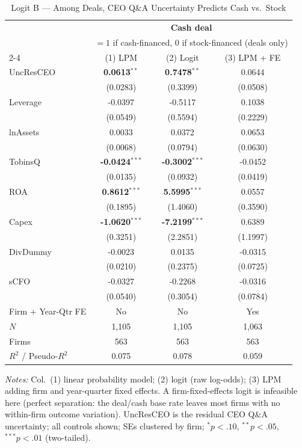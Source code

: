 \documentclass[11pt]{article}
\begin{document}
\clearpage
\begin{table}[htbp]\centering
\caption{Logit B --- Among Deals, CEO Q\&A Uncertainty Predicts Cash vs.\ Stock}
\label{tab:logit_cashstock}
\small\begin{tabular}{lccc}
\toprule
 & \multicolumn{3}{c}{\textbf{Cash deal}} \\
 & \multicolumn{3}{c}{\scriptsize $=1$ if cash-financed, $0$ if stock-financed (deals only)} \\
\cmidrule(lr){2-4}
 & (1) LPM & (2) Logit & (3) LPM + FE \\
\midrule
UncResCEO & \textbf{0.0613}$^{**}$ & \textbf{0.7478}$^{**}$ & 0.0644 \\
 & (0.0283) & (0.3399) & (0.0508) \\
\midrule
Leverage & -0.0397 & -0.5117 & 0.1038 \\
 & (0.0549) & (0.5594) & (0.2229) \\
lnAssets & 0.0033 & 0.0372 & 0.0653 \\
 & (0.0068) & (0.0794) & (0.0630) \\
TobinsQ & \textbf{-0.0424}$^{***}$ & \textbf{-0.3002}$^{***}$ & -0.0452 \\
 & (0.0135) & (0.0932) & (0.0419) \\
ROA & \textbf{0.8612}$^{***}$ & \textbf{5.5995}$^{***}$ & 0.0557 \\
 & (0.1895) & (1.4060) & (0.3590) \\
Capex & \textbf{-1.0620}$^{***}$ & \textbf{-7.2199}$^{***}$ & 0.6389 \\
 & (0.3251) & (2.2851) & (1.1997) \\
DivDummy & -0.0023 & 0.0135 & -0.0315 \\
 & (0.0210) & (0.2375) & (0.0725) \\
sCFO & -0.0327 & -0.2268 & -0.0316 \\
 & (0.0540) & (0.3054) & (0.0784) \\
\midrule
Firm + Year-Qtr FE & No & No & Yes \\
$N$ & 1,105 & 1,105 & 1,063 \\
Firms & 563 & 563 & 563 \\
$R^2$ / Pseudo-$R^2$ & 0.075 & 0.078 & 0.059 \\
\bottomrule\end{tabular}
\begin{minipage}{\linewidth}\vspace{2pt}\scriptsize\textit{Notes:} Col.\ (1) linear probability model; (2) logit (raw log-odds); (3) LPM adding firm and year-quarter fixed effects. A firm-fixed-effects logit is infeasible here (perfect separation: the deal/cash base rate leaves most firms with no within-firm outcome variation). UncResCEO is the residual CEO Q\&A uncertainty; all controls shown; SEs clustered by firm; $^{*}p<.10$, $^{**}p<.05$, $^{***}p<.01$ (two-tailed).\end{minipage}
\end{table}
\end{document}
